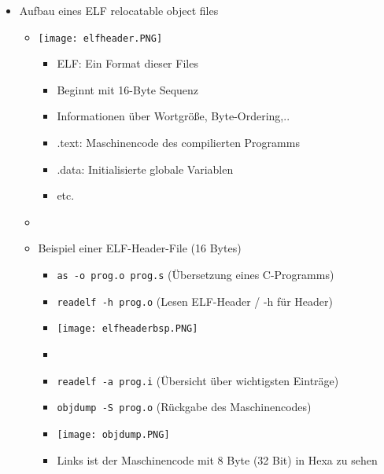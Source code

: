 \begin{itemize}
\begin{itemize}
                \item Aufbau eines ELF relocatable object files
                    \begin{itemize}
                        \item[]
                            \begin{minipage}{0.35\textwidth}
                                \texttt{[image: elfheader.PNG]}
                            \end{minipage}
                            \begin{minipage}{0.55\textwidth}
                                \vspace{-2cm}
                                \begin{itemize}
                                    \item ELF: Ein Format dieser Files
                                    \item Beginnt mit 16-Byte Sequenz
                                    \item Informationen über Wortgrö\ss e, Byte-Ordering,..
                                    \item .text: Maschinencode des compilierten Programms
                                    \item .data: Initialisierte globale Variablen
                                    \item etc.
                                \end{itemize}
                            \end{minipage}

                        \item[]
                        \item Beispiel einer ELF-Header-File (16 Bytes)
                            \begin{itemize}
                                \item \texttt{as -o prog.o prog.s} (Übersetzung eines C-Programms)
                                \item \texttt{readelf -h prog.o} (Lesen ELF-Header / -h für Header) 
                                \item[] \texttt{[image: elfheaderbsp.PNG]}
                                \item[]
                                \item \texttt{readelf -a prog.i} (Übersicht über wichtigsten Einträge)
                                \item \texttt{objdump -S prog.o} (Rückgabe des Maschinencodes)
                                \item[] \texttt{[image: objdump.PNG]}
                                \item Links ist der Maschinencode mit 8 Byte (32 Bit) in Hexa zu sehen 
                            \end{itemize}
                    \end{itemize}
            \end{itemize}


\end{itemize}
